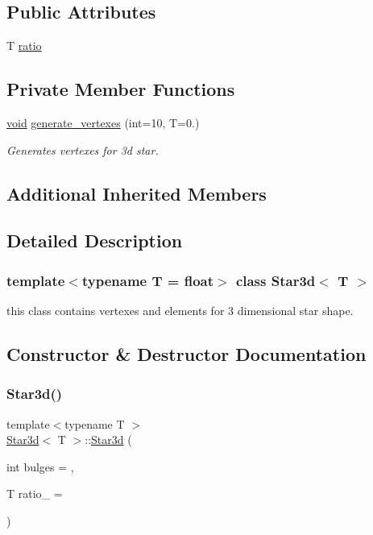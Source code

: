 \subsection*{Public Attributes}
\begin{DoxyCompactItemize}
\item 
T \mbox{\hyperlink{classStar3d_a4c2be78d1baa7a423885cc3574591848}{ratio}}
\end{DoxyCompactItemize}
\subsection*{Private Member Functions}
\begin{DoxyCompactItemize}
\item 
\mbox{\hyperlink{glad_8h_a950fc91edb4504f62f1c577bf4727c29}{void}} \mbox{\hyperlink{classStar3d_a43617f398a59d73eb85df49539f9efa5}{generate\+\_\+vertexes}} (int=10, T=0.)
\begin{DoxyCompactList}\small\item\em Generates vertexes for 3d star. \end{DoxyCompactList}\end{DoxyCompactItemize}
\subsection*{Additional Inherited Members}


\subsection{Detailed Description}
\subsubsection*{template$<$typename T = float$>$\newline
class Star3d$<$ T $>$}

this class contains vertexes and elements for 3 dimensional star shape. 

\subsection{Constructor \& Destructor Documentation}
\mbox{\label{classStar3d_ad264da858df1ef77144a4cd7345185da}} 
\subsubsection{\texorpdfstring{Star3d()}{Star3d()}\hspace{0.1cm}{\footnotesize\ttfamily [1/3]}}
{\footnotesize\ttfamily template$<$typename T $>$ \\
\mbox{\hyperlink{classStar3d}{Star3d}}$<$ T $>$\+::\mbox{\hyperlink{classStar3d}{Star3d}} (\begin{DoxyParamCaption}\item[{int}]{bulges = {},  }\item[{T}]{ratio\+\_\+ = {} }\end{DoxyParamCaption})}

